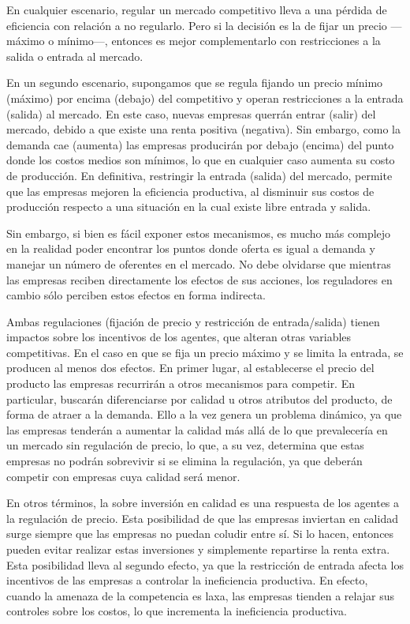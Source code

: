 \documentclass[
  12pt,
  spanish,
]{book}
\begin{document}
En cualquier escenario, regular un mercado competitivo lleva a una
pérdida de eficiencia con relación a no regularlo. Pero si la decisión
es la de fijar un precio ---máximo o mínimo---, entonces es mejor
complementarlo con restricciones a la salida o entrada al mercado.

En un segundo escenario, supongamos que se regula fijando un precio
mínimo (máximo) por encima (debajo) del competitivo y operan
restricciones a la entrada (salida) al mercado. En este caso, nuevas
empresas querrán entrar (salir) del mercado, debido a que existe una
renta positiva (negativa). Sin embargo, como la demanda cae (aumenta)
las empresas producirán por debajo (encima) del punto donde los costos
medios son mínimos, lo que en cualquier caso aumenta su costo de
producción. En definitiva, restringir la entrada (salida) del mercado,
permite que las empresas mejoren la eficiencia productiva, al disminuir
sus costos de producción respecto a una situación en la cual existe
libre entrada y salida.

Sin embargo, si bien es fácil exponer estos mecanismos, es mucho más
complejo en la realidad poder encontrar los puntos donde oferta es igual
a demanda y manejar un número de oferentes en el mercado. No debe
olvidarse que mientras las empresas reciben directamente los efectos de
sus acciones, los reguladores en cambio sólo perciben estos efectos en
forma indirecta.

Ambas regulaciones (fijación de precio y restricción de entrada/salida)
tienen impactos sobre los incentivos de los agentes, que alteran otras
variables competitivas. En el caso en que se fija un precio máximo y se
limita la entrada, se producen al menos dos efectos. En primer lugar, al
establecerse el precio del producto las empresas recurrirán a otros
mecanismos para competir. En particular, buscarán diferenciarse por
calidad u otros atributos del producto, de forma de atraer a la demanda.
Ello a la vez genera un problema dinámico, ya que las empresas tenderán
a aumentar la calidad más allá de lo que prevalecería en un mercado sin
regulación de precio, lo que, a su vez, determina que estas empresas no
podrán sobrevivir si se elimina la regulación, ya que deberán competir
con empresas cuya calidad será menor.

En otros términos, la sobre inversión en calidad es una respuesta de los
agentes a la regulación de precio. Esta posibilidad de que las empresas
inviertan en calidad surge siempre que las empresas no puedan coludir
entre sí. Si lo hacen, entonces pueden evitar realizar estas inversiones
y simplemente repartirse la renta extra. Esta posibilidad lleva al
segundo efecto, ya que la restricción de entrada afecta los incentivos
de las empresas a controlar la ineficiencia productiva. En efecto,
cuando la amenaza de la competencia es laxa, las empresas tienden a
relajar sus controles sobre los costos, lo que incrementa la
ineficiencia productiva.
\end{document}
